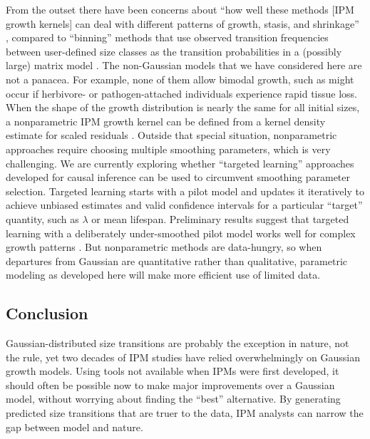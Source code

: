 \documentclass[12pt]{article}
\begin{document}
\begin{spacing}{1.9}
From the outset there have been concerns about ``how well these methods [IPM growth kernels] can deal with different patterns of growth, stasis, and shrinkage'' \citep[][p. 200]{morris-doak-2002}, compared to ``binning'' methods that use observed transition frequencies between user-defined size classes as the transition probabilities in a (possibly large) matrix model \citep{doak-critical-2021}. 
The non-Gaussian models that we have considered here are not a panacea. 
For example, none of them allow bimodal growth, such as might occur if herbivore- or pathogen-attached individuals experience rapid tissue loss. 
When the shape of the growth distribution is nearly the same for all initial sizes, a nonparametric IPM growth kernel can be defined from a kernel density estimate for scaled residuals \citep[][p. 288]{ellner-etal-2016}. 
Outside that special situation, nonparametric approaches require choosing multiple smoothing parameters, which is very challenging. 
We are currently exploring whether ``targeted learning'' approaches developed for causal inference \citep{vande-rose-2011} can be used to circumvent smoothing parameter selection. 
Targeted learning starts with a pilot model and updates it iteratively to achieve unbiased estimates and valid confidence intervals for a particular ``target'' quantity, such as $\lambda$ or mean lifespan. 
Preliminary results suggest that targeted learning with a deliberately under-smoothed pilot model works well for complex growth patterns \citep{zhou2024targeted}. 
But nonparametric methods are data-hungry, so when departures from Gaussian are quantitative rather than qualitative, parametric modeling as developed here will make more efficient use of limited data.

 \subsection*{Conclusion}
Gaussian-distributed size transitions are probably the exception in nature, not the rule, yet two decades of IPM studies have relied overwhelmingly on Gaussian growth models. 
Using tools not available when IPMs were first developed, %
it should often be possible now to make major improvements over a Gaussian model, without worrying about finding the ``best'' alternative. 
By generating predicted size transitions that are truer to the data, IPM analysts can narrow the gap between model and nature. 


\end{spacing}
\end{document}
